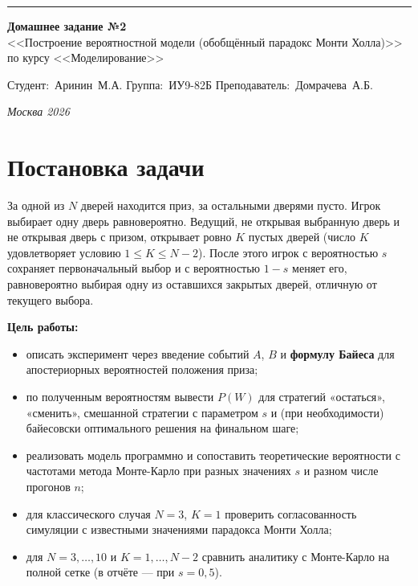 \documentclass[a4paper, 14pt]{extarticle}
\begin{document}
\begin{titlepage}
\vspace*{-16pt}
\hspace{30pt}\rule{0.866\textwidth}{0.4pt}

\vspace{11em}

\begin{center}
\Large {\bf Домашнее задание №2} \\ 
\large <<Построение вероятностной модели (обобщённый парадокс Монти Холла)>> \\
\large {по курсу <<Моделирование>>} \\

\end{center}\normalsize

\vspace{8em}

\vbox{%
\hfill%
\vbox{%
\hbox{Студент: Аринин М.А.}%
\hbox{Группа: ИУ9-82Б}%
\hbox{Преподаватель: Домрачева А.Б.}%
}%
} 

\bigskip

\vfill

\begin{center}
\textsl{Москва 2026}
\end{center}
\end{titlepage}

\setlength{\tabcolsep}{3pt}

\newpage
\setcounter{page}{2}

\section{Постановка задачи}

За одной из $N$ дверей находится приз, за остальными дверями пусто. Игрок выбирает одну дверь равновероятно. Ведущий, не открывая выбранную дверь и не открывая дверь с призом, открывает ровно $K$ пустых дверей (число $K$ удовлетворяет условию $1 \le K \le N-2$). После этого игрок с вероятностью $s$ сохраняет первоначальный выбор и с вероятностью $1-s$ меняет его, равновероятно выбирая одну из оставшихся закрытых дверей, отличную от текущего выбора.

\textbf{Цель работы:}
\begin{itemize}[nosep]
  \item описать эксперимент через введение событий $A$, $B$ и \textbf{формулу Байеса} для апостериорных вероятностей положения приза;
  \item по полученным вероятностям вывести $P(W)$ для стратегий «остаться», «сменить», смешанной стратегии с параметром $s$ и (при необходимости) байесовски оптимального решения на финальном шаге;
  \item реализовать модель программно и сопоставить теоретические вероятности с частотами метода Монте-Карло при разных значениях $s$ и разном числе прогонов $n$;
  \item для классического случая $N=3$, $K=1$ проверить согласованность симуляции с известными значениями парадокса Монти Холла;
  \item для $N=3,\ldots,10$ и $K=1,\ldots,N-2$ сравнить аналитику с Монте-Карло на полной сетке (в отчёте --- при $s=0{,}5$).
\end{itemize}
\end{document}
